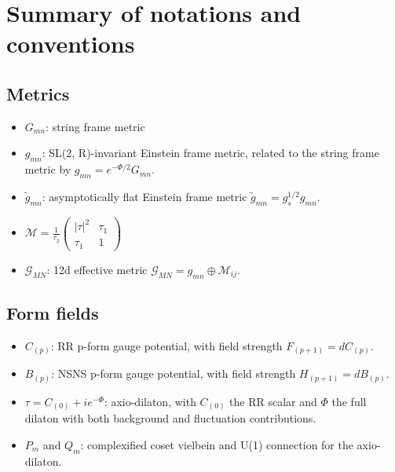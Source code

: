 \section{Summary of notations and conventions}
\subsection{Metrics}
\begin{itemize}
    \item $G_{mn}$: string frame metric
    \item $g_{mn}$: SL(2, R)-invariant Einstein frame metric, related to the string frame metric by $g_{mn} = e^{-\Phi/2}G_{mn}$.
    \item $\tilde{g}_{mn}$: asymptotically flat Einstein frame metric $\tilde{g}_{mn} = g_s^{1/2}g_{mn}$.
    \item $\mathcal{M} = \frac{1}{\tau_2}\begin{pmatrix}
        |\tau|^2 & \tau_1\\
        \tau_1 & 1
    \end{pmatrix}$
    \item $\mathcal{G}_{MN}$: 12d effective metric $\mathcal{G}_{MN} = g_{mn} \oplus \mathcal{M}_{ij}$.
\end{itemize}

\subsection{Form fields}

\begin{itemize}
    \item $C_{(p)}$: RR p-form gauge potential, with field strength $F_{(p+1)} = dC_{(p)}$.
    \item $B_{(p)}$: NSNS p-form gauge potential, with field strength $H_{(p+1)} = dB_{(p)}$.
    \item $\tau = C_{(0)} + ie^{-\Phi}$: axio-dilaton, with $C_{(0)}$ the RR scalar and $\Phi$ the full dilaton with both background and fluctuation contributions.
\end{itemize}

\begin{itemize}
    \item $P_m$ and $Q_m$: complexified coset vielbein and U(1) connection for the axio-dilaton.
\end{itemize}

